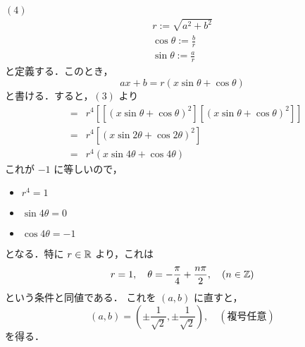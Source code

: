 \documentclass[main]{subfiles}
\begin{document}
\begin{pf}
$(4)$ 
\begin{eqnarray*}
r := \sqrt{a^2+b^2} \\
\cos\theta := \frac{b}{r} \\
\sin\theta := \frac{a}{r}
\end{eqnarray*}
と定義する．このとき，
\begin{equation*}
ax+b= r(x\sin\theta+\cos\theta)
\end{equation*}
と書ける．すると，$(3)$ より
\begin{eqnarray*}
[(ax+b)^4]&=&r^4[[(x\sin\theta+\cos\theta)^2][(x\sin\theta+\cos\theta)^2]] \\
&=&r^4[(x\sin2\theta+\cos2\theta)^2] \\
&=&r^4(x\sin4\theta+\cos4\theta)
\end{eqnarray*}
これが $-1$ に等しいので，
\begin{itemize}
\item $r^4 = 1$ \\
\item $\sin4\theta = 0$ \\
\item $\cos4\theta = -1$
\end{itemize}
となる．特に $r \in \mathbb{R}$ より，これは
\begin{equation*}
r = 1,\quad \theta = -\frac{\pi}{4}+\frac{n\pi}{2}, \quad (n \in \mathbb{Z})
\end{equation*}
という条件と同値である．
これを $(a,b)$ に直すと，
\begin{equation*}
(a,b)=(\pm \frac{1}{\sqrt{2}}, \pm \frac{1}{\sqrt{2}}) ,\quad (\text{複号任意})
\end{equation*}
を得る．
\end{pf}
\begin{prob}

\end{prob}
\end{document}
